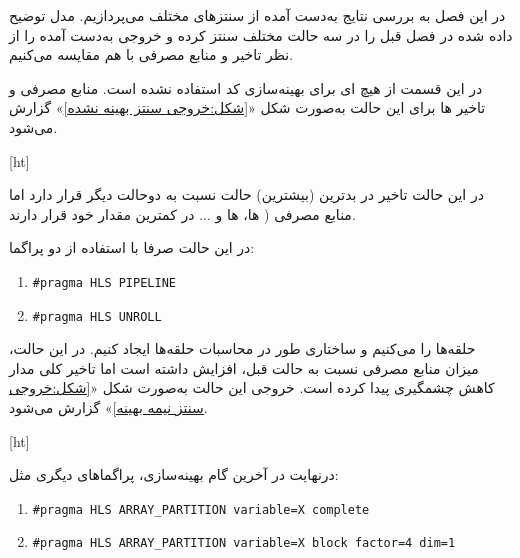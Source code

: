 
در این فصل به بررسی نتایج به‌دست آمده از سنتز‌های مختلف می‌پردازیم. مدل توضیح داده شده در فصل قبل را در سه حالت مختلف سنتز کرده و خروجی به‌دست آمده را از نظر تاخیر و منابع مصرفی با هم مقایسه می‌کنیم.




در این قسمت از هیچ ای برای بهینه‌سازی کد استفاده نشده است. منابع مصرفی و تاخیر ها برای این حالت به‌صورت شکل «\ref{شکل:خروجی سنتز بهینه نشده}» گزارش می‌شود.


[ht]


در این حالت تاخیر در بدترین (بیشترین) حالت نسبت به دوحالت دیگر قرار دارد اما منابع مصرفی ( ها،  ها و ... در کمترین مقدار خود قرار دارند.





در این حالت صرفا با استفاده از دو پراگما:

\begin{latin}
	\begin{enumerate}
		\item \texttt{\#pragma HLS PIPELINE}
		\item \texttt{\#pragma HLS UNROLL}
	\end{enumerate}
\end{latin}


حلقه‌ها را می‌کنیم و ساختاری  طور در محاسبات حلقه‌ها ایجاد کنیم. در این حالت، میزان منابع مصرفی نسبت به حالت قبل، افزایش داشته است اما تاخیر کلی مدار کاهش چشمگیری پیدا کرده است. خروجی این حالت به‌صورت شکل «\ref{شکل:خروجی سنتز نیمه بهینه}» گزارش می‌شود.


[ht]



درنهایت در آخرین گام بهینه‌سازی، پراگما‌های دیگری مثل:

\begin{latin}
	\begin{enumerate}
		\item \texttt{\#pragma HLS ARRAY\_PARTITION variable=X complete}
		\item \texttt{\#pragma HLS ARRAY\_PARTITION variable=X block factor=4 dim=1}
	\end{enumerate}
\end{latin}

